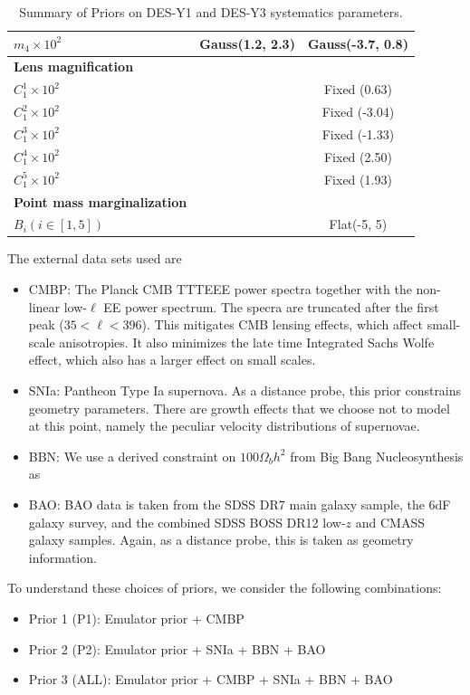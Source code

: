 \begin{table}
\begin{tabular}{lcc}
$m_{4} \times 10^2$ & Gauss(1.2, 2.3) & Gauss(-3.7, 0.8)\\
\hline
\textbf{Lens magnification} \\
$C_{\mathrm{1}}^1 \times 10^2$ & & Fixed (0.63)\\
$C_{\mathrm{1}}^2 \times 10^2$ & & Fixed (-3.04)\\
$C_{\mathrm{1}}^3 \times 10^2$ & & Fixed (-1.33)\\
$C_{\mathrm{1}}^4 \times 10^2$ & & Fixed (2.50)\\
$C_{\mathrm{1}}^5 \times 10^2$ & & Fixed (1.93)\\
\hline
\textbf{Point mass marginalization} \\
$B_i(i \in [1,5])$ & & Flat(-5, 5) \\
\hline
\end{tabular}
\caption{Summary of Priors on DES-Y1 and DES-Y3 systematics parameters.}
\label{table:prior_choices}
\end{table}
The external data sets used are
\begin{itemize}
	\item CMBP: The Planck CMB TTTEEE power spectra together with the non-linear low-$\ell$ EE power spectrum. The specra are truncated after the first peak ($35<\ell<396$). This mitigates CMB lensing effects, which affect small-scale anisotropies. It also minimizes the late time Integrated Sachs Wolfe effect, which also has a larger effect on small scales.
	\item SNIa: Pantheon Type Ia supernova. As a distance probe, this prior constrains geometry parameters. There are growth effects that we choose not to model at this point, namely the peculiar velocity distributions of supernovae.
	\item BBN: We use a derived constraint on $100\Omega_bh^2$ from Big Bang Nucleosynthesis as
	\item BAO: BAO data is taken from the SDSS DR7 main galaxy sample, the 6dF galaxy survey, and the combined SDSS BOSS DR12 low-$z$ and CMASS galaxy samples. Again, as a distance probe, this is taken as geometry information.
\end{itemize}
To understand these choices of priors, we consider the following combinations:
\begin{itemize}
	\item Prior 1 (P1): Emulator prior + CMBP
	\item Prior 2 (P2): Emulator prior + SNIa + BBN + BAO
	\item Prior 3 (ALL): Emulator prior + CMBP + SNIa + BBN + BAO
\end{itemize}
